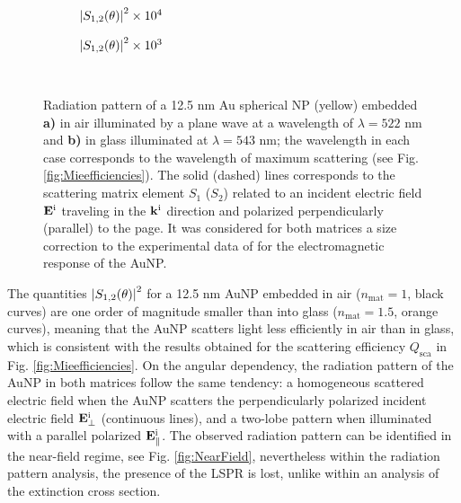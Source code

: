 \begin{figure}[t!]
	\small\centering
	\def\svgwidth{.9\textwidth}
		\vspace*{1.5em}
		\hspace*{-.25\textwidth}
	\begin{subfigure}{.45\textwidth}%
		\caption{$\abs{S_{1,2}(\theta)}^2\times 10^4$} \label{fig:ScatteringMaps:a}%
		\end{subfigure}%
	\begin{subfigure}{.45\textwidth}%
		\caption{$\abs{S_{1,2}(\theta)}^2\times 10^3$}\label{fig:ScatteringMaps:b}%
		\end{subfigure}%
	\vspace*{-4.5em}\\
	\vspace*{-.5em}
	\caption[Radiation Pattern of a 12.5 nm Au Spherical NP embedded in Air and Glass]{Radiation pattern of a 12.5 nm Au spherical NP (yellow) embedded \textbf{a)} in air illuminated by a plane wave at a wavelength of $\lambda = 522$ nm and \textbf{b)} in glass illuminated at $\lambda = 543$ nm; the wavelength in each case corresponds to the wavelength of maximum scattering (see Fig. \ref{fig:Mieefficiencies}). The solid (dashed) lines corresponds to the scattering matrix element $S_1$ ($S_2$) related to an incident electric field $\vb{E}^\text{i}$ traveling in the $\vb{k}^\text{i}$ direction  and polarized perpendicularly (parallel) to the page. It was considered for both matrices a size correction to the experimental data of \citeauthor{johnson_optical_1972} \cite{johnson_optical_1972} for the electromagnetic response of the AuNP.}%
	\label{fig:ScatteringMaps}
 \end{figure}

The quantities $\abs{S_{1,2}(\theta)}^2$ for a 12.5 nm AuNP embedded in air ($n_\text{mat} = 1$, black curves) are one order of magnitude smaller  than into glass ($n_\text{mat} = 1.5$, orange curves), meaning that the AuNP scatters light less efficiently in air than in glass, which is consistent with the results obtained  for the scattering efficiency $Q_\text{sca}$ in Fig. \ref{fig:Mieefficiencies}. On the angular dependency, the radiation pattern of the AuNP in both matrices follow the same tendency: a homogeneous scattered electric field when the AuNP scatters the perpendicularly polarized incident electric field  $\vb{E}^\text{i}_\perp$ (continuous lines), and a two-lobe pattern when illuminated with a parallel polarized $\vb{E}^\text{i}_\parallel$. The observed radiation pattern can be identified in the near-field regime, see Fig. \ref{fig:NearField}, nevertheless within the radiation pattern analysis, the presence of the LSPR is lost, unlike within an analysis of the extinction cross section.
